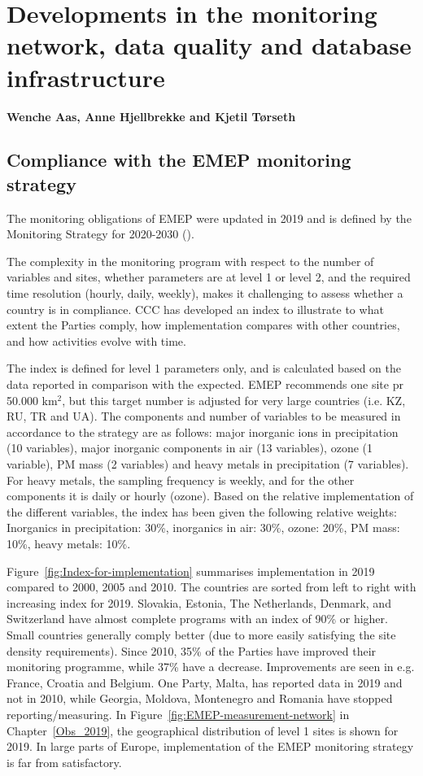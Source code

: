 \chapter[Development of measurements]{Developments in the monitoring network, data quality and database infrastructure}\label{ch:ObsDevel}

{\bf{Wenche Aas, Anne Hjellbrekke and Kjetil T{\o}rseth}}
\vspace{30pt}

\section{\label{sec:Compliance-with-monitoring}Compliance with the EMEP monitoring strategy}

The monitoring obligations of EMEP were updated in 2019 and is defined by the Monitoring Strategy for 2020-2030 (\cite{MonStrat2019}). 

The complexity in the monitoring program with respect to the number of variables and sites, whether parameters are at level 1 or level 2, and the required time resolution (hourly, daily, weekly), makes it challenging to assess whether a country is in compliance. CCC has developed an index to illustrate to what extent the Parties comply, how implementation compares with other countries, and how activities evolve with time.

The index is defined for level 1 parameters only, and is calculated based on the data reported in comparison with the expected. EMEP recommends one site pr 50.000 km$^{2}$, but this target number is adjusted for very large countries (i.e. KZ, RU, TR and UA). The components and number of variables to be measured in accordance to the strategy are as follows: major inorganic ions in precipitation (10 variables), major inorganic components in air (13 variables), ozone (1 variable), PM mass (2 variables) and heavy metals in precipitation (7 variables). For heavy metals, the sampling frequency is weekly, and for the other components it is daily or hourly (ozone). Based on the relative implementation of the different variables, the index has been given the following relative weights: Inorganics in precipitation: 30\%, inorganics in air: 30\%, ozone: 20\%, PM mass: 10\%, heavy metals: 10\%.

Figure~\ref{fig:Index-for-implementation} summarises implementation in 2019 compared to 2000, 2005 and 2010. The countries are sorted from left to right with increasing index for 2019. Slovakia,  Estonia, The Netherlands, Denmark, and Switzerland have almost complete programs with an index of 90\% or higher. Small countries generally comply better (due to more easily satisfying the site density requirements). Since 2010, 35\% of the Parties have improved their monitoring programme,  while 37\% have a decrease. Improvements are seen in e.g. France, Croatia and Belgium.  One Party, Malta, has reported data in 2019 and not in 2010, while Georgia, Moldova, Montenegro and Romania have stopped reporting/measuring. In Figure~\ref{fig:EMEP-measurement-network} in Chapter~\ref{Obs_2019}, the geographical distribution of level 1 sites is shown for 2019.  In large parts of Europe, implementation of the EMEP monitoring strategy is far from satisfactory. 

